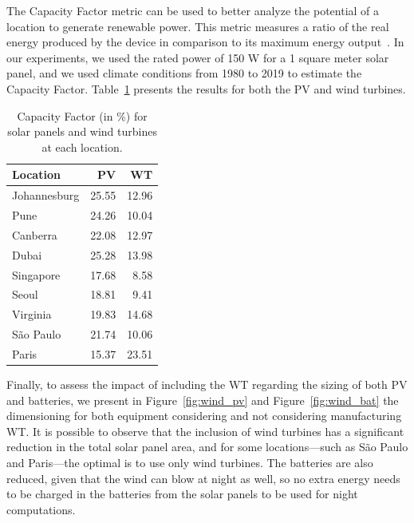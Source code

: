 The Capacity Factor metric can be used to better analyze the potential of a location to generate renewable power. This metric measures a ratio of the real energy produced by the device in comparison to its maximum energy output~\cite{NREL_2012_capacityfactor}. In our experiments, we used the rated power of 150 W for a 1 square meter solar panel, and we used climate conditions from 1980 to 2019 to estimate the Capacity Factor. Table~\ref{tab:capacity_factor} presents the results for both the PV and wind turbines.

\begin{table}[H]
  
  \caption{Capacity Factor (in \%) for solar panels and wind turbines at each location.}\label{tab:capacity_factor} \centering
  
  \begin{tabular}{|l|r|r|}
  \hline    
  \textbf{Location} &   \textbf{PV} & \textbf{WT}  \\
  \hline
  Johannesburg & 25.55 & 12.96  \\
  \hline
  Pune        &  24.26   & 10.04    \\
  \hline
  Canberra    & 22.08    & 12.97  \\
  \hline
  Dubai      & 25.28      & 13.98   \\
  \hline
  Singapore & 17.68    & 8.58   \\
  \hline     
  Seoul      & 18.81   &  9.41   \\
  \hline
  Virginia   & 19.83   &  14.68 \\
  \hline
  São Paulo  & 21.74   &  10.06    \\
  \hline 
  Paris      & 15.37   &  23.51   \\
  \hline  

\end{tabular}
\end{table}


Finally, to assess the impact of including the WT regarding the sizing of both PV and batteries, we present in Figure~\ref{fig:wind_pv} and Figure~\ref{fig:wind_bat}  the dimensioning for both equipment considering and not considering manufacturing WT. It is possible to observe that the inclusion of wind turbines has a significant reduction in the total solar panel area, and for some locations---such as São Paulo and Paris---the optimal is to use only wind turbines. The batteries are also reduced, given that the wind can blow at night as well, so no extra energy needs to be charged in the batteries from the solar panels to be used for night computations.


